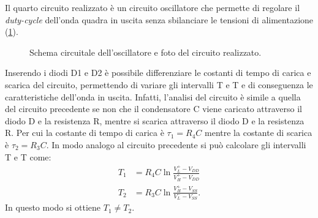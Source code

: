 \clearpage
Il quarto circuito realizzato è un circuito oscillatore che permette di regolare il \textit{duty-cycle} dell'onda quadra in uscita senza sbilanciare le tensioni di alimentazione (\Fig\ref{fig:circuito_4}). 
\begin{figure}[h!]
	\centering
	\begin{minipage}{.45\textwidth}
	\end{minipage}\qquad
	\begin{minipage}{.45\textwidth}
	\end{minipage}
	\caption{Schema circuitale dell'oscillatore e foto del circuito realizzato.}
	\label{fig:circuito_4}
\end{figure}

\noindent
Inserendo i diodi D1 e D2 è possibile differenziare le costanti di tempo di carica e scarica del circuito, permettendo di variare gli intervalli T e T e di conseguenza le caratteristiche dell'onda in uscita. Infatti, l'analisi del circuito è simile a quella del circuito precedente se non che il condensatore C viene caricato attraverso il diodo D e la resistenza R, mentre si scarica attraverso il diodo D e la resistenza R. Per cui la costante di tempo di carica è $\tau_1 = R_4C$ mentre la costante di scarica è $\tau_2=R_3C$. In modo analogo al circuito precedente si può calcolare gli intervalli T e T come:
\begin{equation}
	\begin{split}
		T_1&=R_4C \ln{\frac{V_L^+-V_{DD}}{V_H^+-V_{DD}}} \\
		T_2&=R_3C \ln{\frac{V_H^+-V_{SS}}{V_L^--V_{SS}}}.
	\end{split}
\end{equation}
In questo modo si ottiene $T_1 \ne T_2$.

